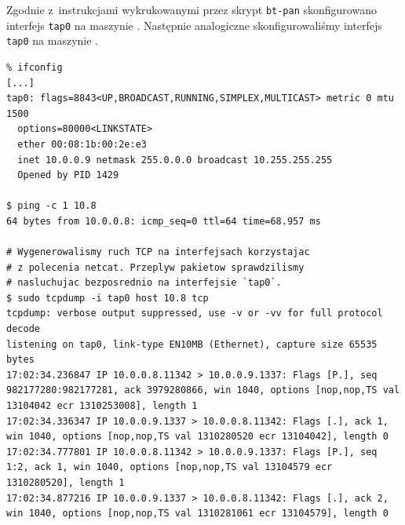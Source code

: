 Zgodnie z~instrukcjami wykrukowanymi przez skrypt \texttt{bt-pan} skonfigurowano
interfejs \texttt{tap0} na maszynie \kdziew. Następnie analogiczne
skonfigurowaliśmy interfejs \texttt{tap0} na maszynie \kosiem.

\begin{lstlisting}[caption={Konfiguracja wirtualnego interfejsu obsługującego \bt{} zgodnie z~protokołem IP na maszynie \kdziew.}]
% sudo ifconfig tap0 10.9
% ifconfig
[...]
tap0: flags=8843<UP,BROADCAST,RUNNING,SIMPLEX,MULTICAST> metric 0 mtu 1500
  options=80000<LINKSTATE>
  ether 00:08:1b:00:2e:e3
  inet 10.0.0.9 netmask 255.0.0.0 broadcast 10.255.255.255
  Opened by PID 1429

$ ping -c 1 10.8
64 bytes from 10.0.0.8: icmp_seq=0 ttl=64 time=68.957 ms

# Wygenerowalismy ruch TCP na interfejsach korzystajac
# z polecenia netcat. Przeplyw pakietow sprawdzilismy
# nasluchujac bezposrednio na interfejsie `tap0`.
$ sudo tcpdump -i tap0 host 10.8 tcp
tcpdump: verbose output suppressed, use -v or -vv for full protocol decode
listening on tap0, link-type EN10MB (Ethernet), capture size 65535 bytes
17:02:34.236847 IP 10.0.0.8.11342 > 10.0.0.9.1337: Flags [P.], seq 982177280:982177281, ack 3979280866, win 1040, options [nop,nop,TS val 13104042 ecr 1310253008], length 1
17:02:34.336347 IP 10.0.0.9.1337 > 10.0.0.8.11342: Flags [.], ack 1, win 1040, options [nop,nop,TS val 1310280520 ecr 13104042], length 0
17:02:34.777801 IP 10.0.0.8.11342 > 10.0.0.9.1337: Flags [P.], seq 1:2, ack 1, win 1040, options [nop,nop,TS val 13104579 ecr 1310280520], length 1
17:02:34.877216 IP 10.0.0.9.1337 > 10.0.0.8.11342: Flags [.], ack 2, win 1040, options [nop,nop,TS val 1310281061 ecr 13104579], length 0
\end{lstlisting}
